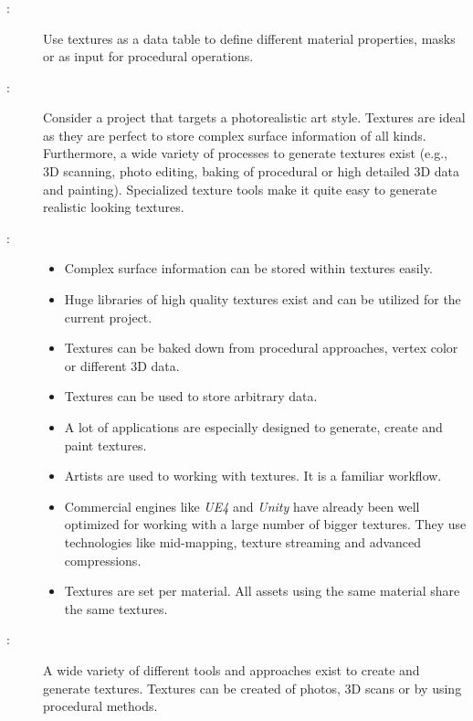 \subsubsection{\parParametersTextures}\label{\parParametersTextures} %
\begin{description}
	\item[\patIntent:]%
	Use textures as a data table to define different material properties, masks or as input for procedural operations.   
	\item[\patMotivation:]%
	Consider a project that targets a photorealistic art style. Textures are ideal as they are perfect to store complex surface information of all kinds. Furthermore, a wide variety of processes to generate textures exist (e.g., 3D scanning, photo editing, baking of procedural or high detailed 3D data and painting). Specialized texture tools make it quite easy to generate realistic looking textures.
	\item[\patApplicability:]\hfill
	\begin{itemize}\mynobreakpar
		\item Complex surface information can be stored within textures easily.
		\item Huge libraries of high quality textures exist and can be utilized for the current project. 
		\item Textures can be baked down from procedural approaches, vertex color or different 3D data. 
		\item Textures can be used to store arbitrary data.
		\item A lot of applications are especially designed to generate, create and paint textures.  
		\item Artists are used to working with textures. It is a familiar workflow. 
		\item Commercial engines like \emph{UE4} and \emph{Unity} have already been well optimized for working with a large number of bigger textures. They use technologies like mid-mapping, texture streaming and advanced compressions. 
		\item Textures are set per material. All assets using the same material share the same textures. 
	\end{itemize} 
	\item[\patImplementation:]%
	A wide variety of different tools and approaches exist to create and generate textures. Textures can be created of photos, 3D scans or by using procedural methods.

\end{description}

